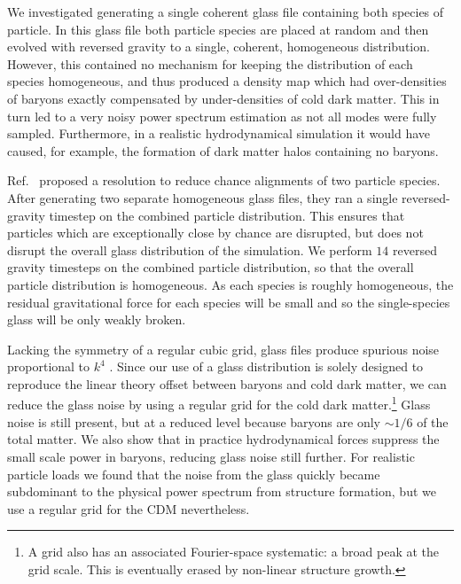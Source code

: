 \documentclass[a4paper,11pt]{article}
\newcommand{\YF}[1]{\textcolor{green}{[\bf YF: #1]} }
\begin{document}
We investigated generating a single coherent glass file containing both species of particle. In this glass file both particle species are placed at random and then evolved with reversed gravity to a single, coherent, homogeneous distribution. However, this contained no mechanism for keeping the distribution of each species homogeneous, and thus produced a density map which had over-densities of baryons exactly compensated by under-densities of cold dark matter. This in turn led to a very noisy power spectrum estimation as not all modes were fully sampled. Furthermore, in a realistic hydrodynamical simulation it would have caused, for example, the formation of dark matter halos containing no baryons.

Ref.~\cite{Yoshida:2003} proposed a resolution to reduce chance alignments of two particle species. After generating two separate homogeneous glass files, they ran a single reversed-gravity timestep on the combined particle distribution. This ensures that particles which are exceptionally close by chance are disrupted, but does not disrupt the overall glass distribution of the simulation. We perform $14$ reversed gravity timesteps on the combined particle distribution, so that the overall particle distribution is homogeneous. As each species is roughly homogeneous, the residual gravitational force for each species will be small and so the single-species glass will be only weakly broken.

Lacking the symmetry of a regular cubic grid, glass files produce spurious noise proportional to $k^4$ \cite{Peebles:1993}. Since our use of a glass distribution is solely designed to reproduce the linear theory offset between baryons and cold dark matter, we can reduce the glass noise by using a regular grid for the cold dark matter.\footnote{A grid also has an associated Fourier-space systematic: a broad peak at the grid scale. This is eventually erased by non-linear structure growth.} Glass noise is still present, but at a reduced level because baryons are only $\sim 1/6$ of the total matter. We also show that in practice hydrodynamical forces suppress the small scale power in baryons, reducing glass noise still further. For realistic particle loads we found that the noise from the glass quickly became subdominant to the physical power spectrum from structure formation, but we use a regular grid for the CDM nevertheless.

\end{document}
